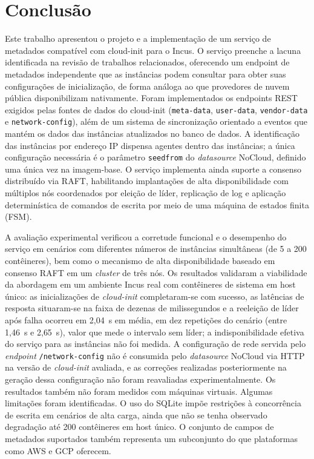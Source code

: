 \section{Conclusão}
\label{sec_conclusao}

Este trabalho apresentou o projeto e a implementação de um serviço de metadados compatível com cloud-init para o Incus. O serviço preenche a lacuna identificada na revisão de trabalhos relacionados, oferecendo um endpoint de metadados independente que as instâncias podem consultar para obter suas configurações de inicialização, de forma análoga ao que provedores de nuvem pública disponibilizam nativamente. Foram implementados os endpoints REST exigidos pelas fontes de dados do cloud-init (\texttt{meta-data}, \texttt{user-data}, \texttt{vendor-data} e \texttt{network-config}), além de um sistema de sincronização orientado a eventos que mantém os dados das instâncias atualizados no banco de dados. A identificação das instâncias por endereço IP dispensa agentes dentro das instâncias; a única configuração necessária é o parâmetro \texttt{seedfrom} do \textit{datasource} NoCloud, definido uma única vez na imagem-base. O serviço implementa ainda suporte a consenso distribuído via RAFT, habilitando implantações de alta disponibilidade com múltiplos nós coordenados por eleição de líder, replicação de log e aplicação determinística de comandos de escrita por meio de uma máquina de estados finita (FSM).

A avaliação experimental verificou a corretude funcional e o desempenho do serviço em cenários com diferentes números de instâncias simultâneas (de 5 a 200 contêineres), bem como o mecanismo de alta disponibilidade baseado em consenso RAFT em um \textit{cluster} de três nós. Os resultados validaram a viabilidade da abordagem em um ambiente Incus real com contêineres de sistema em host único: as inicializações de \textit{cloud-init} completaram-se com sucesso, as latências de resposta situaram-se na faixa de dezenas de milissegundos e a reeleição de líder após falha ocorreu em 2{,}04~s em média, em dez repetições do cenário (entre 1{,}46~s e 2{,}65~s), valor que mede o intervalo sem líder; a indisponibilidade efetiva do serviço para as instâncias não foi medida. A configuração de rede servida pelo \textit{endpoint} \texttt{/network-config} não é consumida pelo \textit{datasource} NoCloud via HTTP na versão de \textit{cloud-init} avaliada, e as correções realizadas posteriormente na geração dessa configuração não foram reavaliadas experimentalmente. Os resultados também não foram medidos com máquinas virtuais. Algumas limitações foram identificadas. O uso do SQLite impõe restrições à concorrência de escrita em cenários de alta carga, ainda que não se tenha observado degradação até 200 contêineres em host único. O conjunto de campos de metadados suportados também representa um subconjunto do que plataformas como AWS e GCP oferecem.

